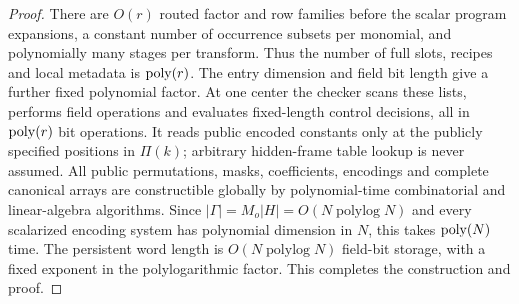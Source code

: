 \begin{proof}
There are $O(r)$ routed factor and row families before the scalar
program expansions, a constant number of occurrence subsets per
monomial, and polynomially many stages per transform.  Thus the
number of full slots, recipes and local metadata is $\operatorname{poly}(r)$.
The entry dimension and field bit length give a further fixed
polynomial factor.  At one center the checker scans these lists,
performs field operations and evaluates fixed-length control
decisions, all in $\operatorname{poly}(r)$ bit operations.  It reads public encoded
constants only at the publicly specified positions in $\Pi(k)$;
arbitrary hidden-frame table lookup is never assumed.
All public permutations, masks, coefficients, encodings and complete
canonical arrays are constructible globally by polynomial-time
combinatorial and linear-algebra algorithms.  Since
$|\Gamma|=M_o|H|=O(N\operatorname{polylog} N)$ and every scalarized encoding system
has polynomial dimension in $N$, this takes $\operatorname{poly}(N)$ time.
The persistent word length is $O(N\operatorname{polylog} N)$ field-bit storage,
with a fixed exponent in the polylogarithmic factor.  This completes
the construction and proof.
\end{proof}
